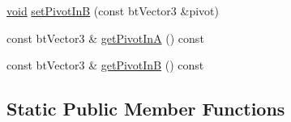 \begin{DoxyCompactItemize}
\item 
\mbox{\hyperlink{_thread_8h_af1e856da2e658414cb2456cb6f7ebc66}{void}} \mbox{\hyperlink{classnjli_1_1_physics_constraint_point_to_point_aab12a17b9530cd91700860c6e8e1fc3e}{set\+Pivot\+InB}} (const bt\+Vector3 \&pivot)
\item 
const bt\+Vector3 \& \mbox{\hyperlink{classnjli_1_1_physics_constraint_point_to_point_a0081daad53ef60302f884626e1da987b}{get\+Pivot\+InA}} () const
\item 
const bt\+Vector3 \& \mbox{\hyperlink{classnjli_1_1_physics_constraint_point_to_point_aaf9a440f01231b52ff5b4e6cc390ed25}{get\+Pivot\+InB}} () const
\end{DoxyCompactItemize}
\subsection*{Static Public Member Functions}
